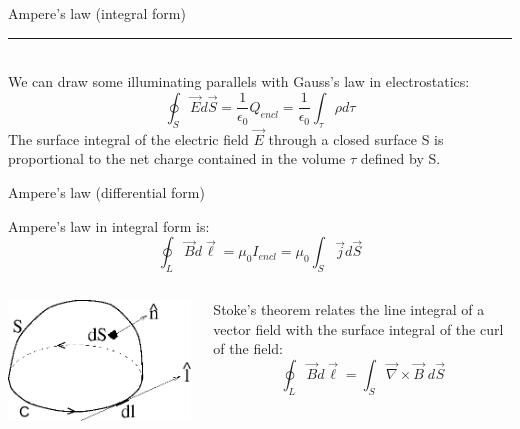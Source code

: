 \begin{frame}{Ampere's law (integral form)}
\vspace{0.2cm}
\noindent\rule{2cm}{0.4pt}\\
{\small
     We can draw some illuminating parallels with Gauss's law in electrostatics:
     \begin{equation*}
        \oint_{S} \vec{E} d\vec{S} = \frac{1}{\epsilon_0} Q_{encl} = \frac{1}{\epsilon_0} \int_{\tau} \rho d\tau
     \end{equation*}
     The surface integral of the electric field $\vec{E}$  through a closed surface S
     is proportional to the net charge contained in the volume $\tau$ defined by S.
}

\end{frame}

%
%
%

\begin{frame}{Ampere's law (differential form)}

Ampere's law in integral form is:
\begin{equation*}
    \oint_{L} \vec{B} d\vec{\ell} = \mu_0 I_{encl} = \mu_0 \int_{S} \vec{j} d\vec{S}
\end{equation*}

\begin{columns}
  \begin{column}{0.25\textwidth}
    \begin{center}
     \includegraphics[width=0.99\textwidth]{./images/schematics/stokes_theorem_C.png}\\
    \end{center}
  \end{column}
  \begin{column}{0.75\textwidth}
     Stoke's theorem relates the line integral of a vector field with the surface integral
     of the curl of the field:
     \begin{equation*}
        \oint_{L} \vec{B} d\vec{\ell} = \int_{S} \vec{\nabla} \times \vec{B} \; d\vec{S}
     \end{equation*}
  \end{column}
\end{columns}


\end{frame}
